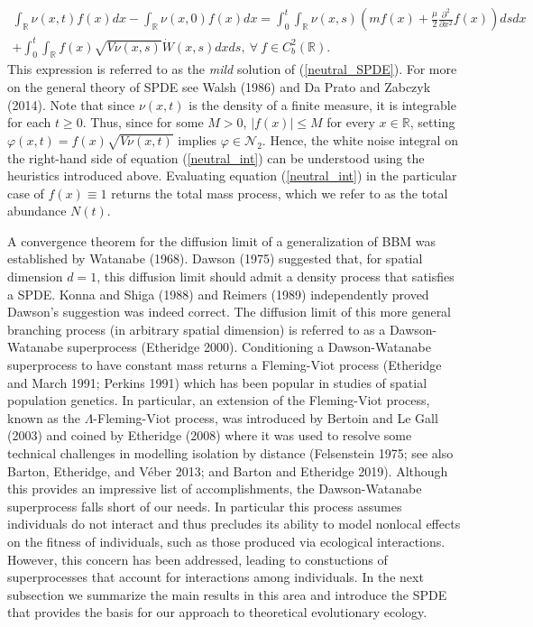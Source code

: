 \documentclass[]{article}
\begin{document}
\begin{multline}\label{neutral_int}
\int_\mathbb{R}\nu(x,t)f(x)dx-\int_\mathbb{R}\nu(x,0)f(x)dx=\int_0^t\int_\mathbb{R}\nu(x,s)\left(mf(x)+\frac{\mu}{2}\frac{\partial^2}{\partial x^2}f(x)\right)dsdx \\
+\int_0^t\int_\mathbb{R}f(x)\sqrt{V\nu(x,s)}\dot W(x,s)dxds, \ \forall \ f\in C_b^2(\mathbb{R}).
\end{multline} This expression is referred to as the \emph{mild}
solution of (\ref{neutral_SPDE}). For more on the general theory of SPDE
see Walsh (1986) and Da Prato and Zabczyk (2014). Note that since
\(\nu(x,t)\) is the density of a finite measure, it is integrable for
each \(t\geq0\). Thus, since for some \(M>0\), \(|f(x)|\leq M\) for
every \(x\in\mathbb{R}\), setting \(\varphi(x,t)=f(x)\sqrt{V\nu(x,t)}\)
implies \(\varphi\in\mathscr{N}_2\). Hence, the white noise integral on
the right-hand side of equation (\ref{neutral_int}) can be understood
using the heuristics introduced above. Evaluating equation
(\ref{neutral_int}) in the particular case of \(f(x)\equiv1\) returns
the total mass process, which we refer to as the total abundance
\(N(t)\).

A convergence theorem for the diffusion limit of a generalization of BBM
was established by Watanabe (1968). Dawson (1975) suggested that, for
spatial dimension \(d=1\), this diffusion limit should admit a density
process that satisfies a SPDE. Konna and Shiga (1988) and Reimers (1989)
independently proved Dawson's suggestion was indeed correct. The
diffusion limit of this more general branching process (in arbitrary
spatial dimension) is referred to as a Dawson-Watanabe superprocess
(Etheridge 2000). Conditioning a Dawson-Watanabe superprocess to have
constant mass returns a Fleming-Viot process (Etheridge and March 1991;
Perkins 1991) which has been popular in studies of spatial population
genetics. In particular, an extension of the Fleming-Viot process, known
as the \(\Lambda\)-Fleming-Viot process, was introduced by Bertoin and
Le Gall (2003) and coined by Etheridge (2008) where it was used to
resolve some technical challenges in modelling isolation by distance
(Felsenstein 1975; see also Barton, Etheridge, and Véber 2013; and
Barton and Etheridge 2019). Although this provides an impressive list of
accomplishments, the Dawson-Watanabe superprocess falls short of our
needs. In particular this process assumes individuals do not interact
and thus precludes its ability to model nonlocal effects on the fitness
of individuals, such as those produced via ecological interactions.
However, this concern has been addressed, leading to constuctions of
superprocesses that account for interactions among individuals. In the
next subsection we summarize the main results in this area and introduce
the SPDE that provides the basis for our approach to theoretical
evolutionary ecology.
\end{document}
